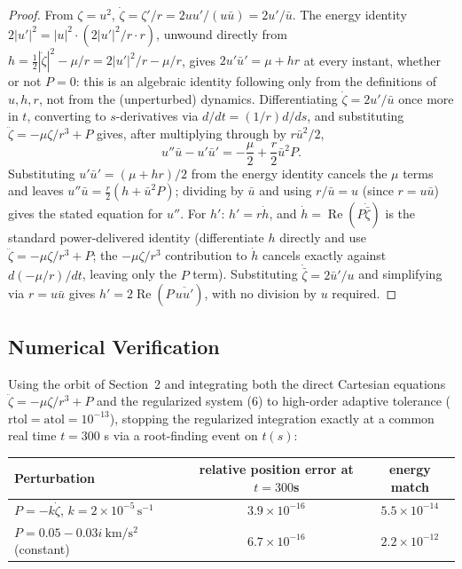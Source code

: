 \documentclass[12pt]{amsart}
\theoremstyle{plain}
\theoremstyle{remark}
\begin{document}
\begin{proof}
From $\zeta=u^2$, $\dot\zeta=\zeta'/r=2uu'/(u\bar u)=2u'/\bar u$. The energy identity $2|u'|^2=|u|^2\!\cdot\! (2|u'|^2/r\cdot r)$, unwound directly from $h=\tfrac12|\dot\zeta|^2-\mu/r=2|u'|^2/r-\mu/r$, gives $2u'\bar u'=\mu+hr$ at every instant, whether or not $P=0$: this is an algebraic identity following only from the definitions of $u,h,r$, not from the (unperturbed) dynamics. Differentiating $\dot\zeta=2u'/\bar u$ once more in $t$, converting to $s$-derivatives via $d/dt=(1/r)d/ds$, and substituting $\ddot\zeta=-\mu\zeta/r^3+P$ gives, after multiplying through by $r\bar u^2/2$,
\[
u''\bar u - u'\bar u' = -\frac\mu2+\frac r2\bar u^2P.
\]
Substituting $u'\bar u'=(\mu+hr)/2$ from the energy identity cancels the $\mu$ terms and leaves $u''\bar u=\tfrac r2(h+\bar u^2P)$; dividing by $\bar u$ and using $r/\bar u=u$ (since $r=u\bar u$) gives the stated equation for $u''$. For $h'$: $h'=r\dot h$, and $\dot h=\operatorname{Re}(P\dot{\bar\zeta})$ is the standard power-delivered identity (differentiate $h$ directly and use $\ddot\zeta=-\mu\zeta/r^3+P$; the $-\mu\zeta/r^3$ contribution to $\dot h$ cancels exactly against $d(-\mu/r)/dt$, leaving only the $P$ term). Substituting $\dot{\bar\zeta}=2\bar u'/u$ and simplifying via $r=u\bar u$ gives $h'=2\operatorname{Re}(P\,\overline{uu'})$, with no division by $u$ required. \qedhere
\end{proof}

\subsection*{Numerical Verification}

Using the orbit of Section~2 and integrating both the direct Cartesian equations $\ddot\zeta=-\mu\zeta/r^3+P$ and the regularized system (6) to high-order adaptive tolerance ($\mathrm{rtol}=\mathrm{atol}=10^{-13}$), stopping the regularized integration exactly at a common real time $t=300$ s via a root-finding event on $t(s)$:

\begin{center}
\begin{tabular}{lcc}
\hline
Perturbation & relative position error at $t=300$s & energy match \\
\hline
$P=-k\dot\zeta$, $k=2\times10^{-5}\,\mathrm{s^{-1}}$ & $3.9\times10^{-16}$ & $5.5\times10^{-14}$ \\
$P=0.05-0.03i\ \mathrm{km/s^2}$ (constant) & $6.7\times10^{-16}$ & $2.2\times10^{-12}$ \\
\hline
\end{tabular}
\end{center}
\end{document}
